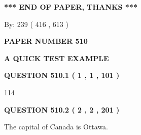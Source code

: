 \documentclass[12pt]{article}
\begin{document}
 
 
 
   
   
 \vspace{0.2in}
 
   
   
   
   
\vspace{1.0in} 
{\textbf{\large{ *** END OF PAPER, THANKS *** }}} 
   
   
\hspace{1.0in} By: 
 239 ( 416 ,  613 )
   
   
   
   
\newpage 
\setcounter{page}{ 
   510001 } 
   
   
   
   
 {\textbf{ \Large{ PAPER NUMBER  510  }}}
   
   
\vspace{0.2in}
   
   
   
   
   
   
 \vspace{0.2in}
{\LARGE {\textbf{ A QUICK TEST EXAMPLE}}}
   
   
  
\vspace{0.2in}
  
{\textbf{\Large{QUESTION
510.1 
 ( 1 , 1 , 101 )
}}}
  
  
 
 
\noindent{}

114
 
 
  
\vspace{0.2in}
  
{\textbf{\Large{QUESTION
510.2 
 ( 2 , 2 , 201 )
}}}
  
  
 
 
\noindent{}
 
 
The capital of Canada is Ottawa.
 
 
 
 
   
   
 \vspace{0.2in}
 
   
   
   
   
\end{document}
